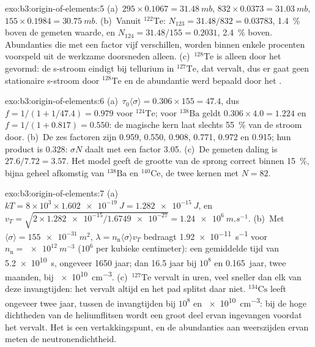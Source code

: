 \begin{solution}{exo:b3:origin-of-elements:5}
(a)~$295\times0.1067 = \qty{31.48}{mb}$, $832\times0.0373 =
\qty{31.03}{mb}$, $155\times0.1984 = \qty{30.75}{mb}$. (b)~Vanuit
$^{122}\mathrm{Te}$: $N_{123} = 31.48/832 = \num{0.03783}$, \qty{1.4}{\percent}
boven de gemeten waarde, en $N_{124} = 31.48/155 = \num{0.2031}$,
\qty{2.4}{\percent} boven. Abundanties die met een factor vijf verschillen, worden
binnen enkele procenten voorspeld uit de werkzame doorsneden alleen.
(c)~$^{128}\mathrm{Te}$ is alleen door het  gevormd: de s-stroom eindigt bij tellurium in
$^{127}\mathrm{Te}$, dat vervalt, dus er gaat geen stationaire s-stroom door
$^{128}\mathrm{Te}$ en de abundantie werd bepaald door het .
\end{solution}

\begin{solution}{exo:b3:origin-of-elements:6}
(a)~$\tau_0\langle\sigma\rangle = 0.306\times155 = 47.4$, dus
$f = 1/(1 + 1/47.4) = \num{0.979}$ voor $^{124}\mathrm{Te}$; voor
$^{138}\mathrm{Ba}$ geldt $0.306\times4.0 = 1.224$ en $f = 1/(1 + 0.817) =
\num{0.550}$: de magische kern laat slechts \qty{55}{\percent} van de
stroom door. (b)~De zes factoren zijn \num{0.959}, \num{0.550}, \num{0.908},
\num{0.771}, \num{0.972} en \num{0.915}; hun product is \num{0.328}:
$\sigma N$ daalt met een factor \num{3.05}. (c)~De gemeten daling is
$27.6/7.72 = 3.57$. Het model geeft de grootte van de sprong correct binnen
\qty{15}{\percent}, bijna geheel afkomstig van $^{138}\mathrm{Ba}$ en
$^{140}\mathrm{Ce}$, de twee kernen met $N = 82$.
\end{solution}

\begin{solution}{exo:b3:origin-of-elements:7}
(a)~$kT = 8\times10^3\times\qty{1.602e-19}{J} = \qty{1.282e-15}{J}$, en
$v_T = \sqrt{2\times\num{1.282e-15}/\num{1.6749e-27}} =
\qty{1.24e6}{m.s^{-1}}$. (b)~Met $\langle\sigma\rangle =
\qty{155e-31}{m^2}$, $\lambda = n_\mathrm{n}\langle\sigma\rangle v_T$
bedraagt \qty{1.92e-11}{s^{-1}} voor $n_\mathrm{n} = \qty{e12}{m^{-3}}$
($10^6$ per kubieke centimeter): een gemiddelde tijd van \qty{5.2e10}{s}, ongeveer
\num{1650} jaar; dan \num{16.5} jaar bij $10^8$ en \num{0.165}~jaar,
twee maanden, bij \qty{e10}{cm^{-3}}. (c)~$^{127}\mathrm{Te}$ vervalt in
uren, veel sneller dan elk van deze invangtijden: het vervalt altijd en
het pad splitst daar niet. $^{134}\mathrm{Cs}$ leeft ongeveer twee
jaar, tussen de invangtijden bij $10^8$ en \qty{e10}{cm^{-3}}: bij
de hoge dichtheden van de heliumflitsen wordt een groot deel ervan
ingevangen voordat het vervalt. Het is een vertakkingspunt, en de abundanties aan weerszijden
ervan meten de neutronendichtheid.
\end{solution}

